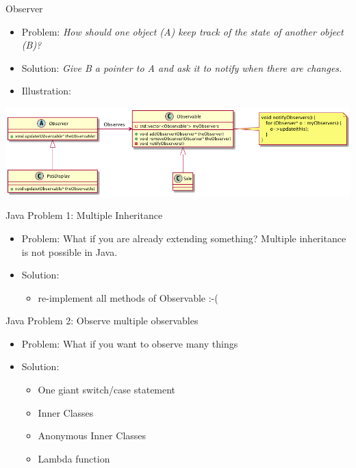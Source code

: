 \documentclass[10pt,t,a4paper]{beamer}
\begin{document}
\begin{frame}[label={sec:orgheadline7}]{Observer}
\begin{itemize}
\item Problem: \emph{How should one object (A) keep track of the state of another object (B)?}
\item Solution: \emph{Give B a pointer to A and ask it to notify when there are changes.}
\item Illustration:
\end{itemize}
\includegraphics[width=.9\linewidth]{FObserver.png}
\end{frame}
\begin{frame}[label={sec:orgheadline8}]{Java Problem 1: Multiple Inheritance}
\begin{itemize}
\item Problem:  What if you are already extending something? Multiple inheritance is not possible in Java.
\item Solution:
\begin{itemize}
\item re-implement all methods of Observable :-(
\end{itemize}
\end{itemize}
\end{frame}
\begin{frame}[label={sec:orgheadline9}]{Java Problem 2: Observe multiple observables}
\begin{itemize}
\item Problem: What if you want to observe many things
\item Solution:
\begin{itemize}
\item One giant switch/case statement
\item Inner Classes
\item Anonymous Inner Classes
\item Lambda function
\end{itemize}
\end{itemize}
\end{frame}
\end{document}
